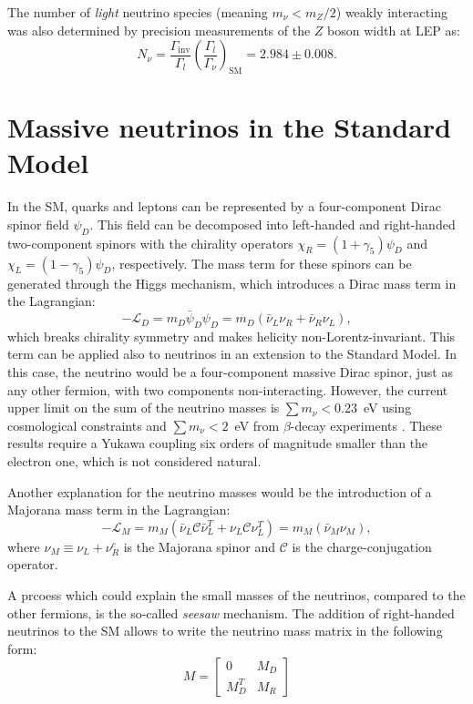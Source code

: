 The number of \emph{light} neutrino species (meaning $m_{\nu} < m_{Z}/2$) weakly interacting  was also determined by precision measurements of the $Z$ boson width at LEP as:
\begin{equation}
   N_{\nu} = \frac{\Gamma_{\mathrm{inv}}}{\Gamma_l}
   \left(\frac{\Gamma_{l}}{\Gamma_{\nu}}\right)_{\mathrm{SM}}=2.984\pm0.008.
\end{equation}

\section{Massive neutrinos in the Standard Model}
In the SM, quarks and leptons can be represented by a four-component Dirac spinor field $\psi_{D}$. This field can be decomposed into left-handed and right-handed two-component spinors with the chirality operators $\chi_{R} = (1+\gamma_5)\psi_D$ and $\chi_{L} = (1-\gamma_5)\psi_D$, respectively. The mass term for these spinors can be generated through the Higgs mechanism, which introduces a Dirac mass term in the Lagrangian:
\begin{equation}
    -\mathcal{L}_D = m_D\bar{\psi}_D\psi_D = m_D(\bar{\nu}_L\nu_R + \bar{\nu}_R\nu_L),
\end{equation}
which breaks chirality symmetry and makes helicity non-Lorentz-invariant.
This term can be applied also to neutrinos in an extension to the Standard Model. In this case, the neutrino would be a four-component massive Dirac spinor, just as any other fermion, with two components non-interacting.
However, the current upper limit on the sum of the neutrino masses is $\sum m_{\nu} < 0.23$~eV using cosmological constraints \cite{Ade:2015xua} and $\sum m_{\nu} < 2$~eV from $\beta$-decay experiments \cite{Otten:2008zz}. These results require a Yukawa coupling six orders of magnitude smaller than the electron one, which is not considered natural.

Another explanation for the neutrino masses would be the introduction of a Majorana mass term in the Lagrangian:
\begin{equation}
    -\mathcal{L}_M = m_M(\bar{\nu}_L\mathcal{C}\bar{\nu}^{T}_L+\nu_{L}\mathcal{C}\nu^T_L) = m_M(\bar{\nu}_M\nu_M),
\end{equation}
where $\nu_{M} \equiv \nu_L + \nu^c_R$ is the Majorana spinor and $\mathcal{C}$ is the charge-conjugation operator. 

A prcoess which could explain the small masses of the neutrinos, compared to the other fermions, is the so-called \emph{seesaw} mechanism. The addition of right-handed neutrinos to the SM allows to write the neutrino mass matrix in the following form:
\begin{equation}
    M = \begin{bmatrix}
    0 & M_D \\
    M_D^T & M_R
    \end{bmatrix}
\end{equation}

